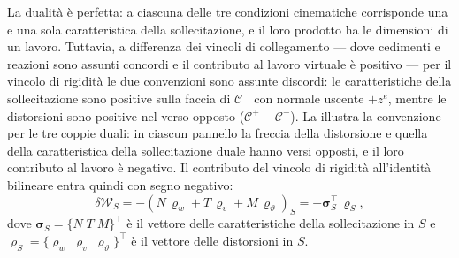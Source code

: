 La dualità è perfetta: a ciascuna delle tre
condizioni cinematiche corrisponde una e una sola
caratteristica della sollecitazione, e il loro
prodotto ha le dimensioni di un lavoro. Tuttavia,
a differenza dei vincoli di collegamento --- dove
cedimenti e reazioni sono assunti concordi e il
contributo al lavoro virtuale è positivo ---
per il vincolo di rigidità le due convenzioni
sono assunte discordi: le caratteristiche della
sollecitazione sono positive sulla faccia di
$\mathcal{C}^-$ con normale uscente $+z^e$, mentre
le distorsioni sono positive nel verso opposto
($\mathcal{C}^+ - \mathcal{C}^-$). 
La  illustra la 
convenzione per le tre coppie duali: in ciascun 
pannello la freccia della distorsione e quella 
della caratteristica della sollecitazione duale 
hanno versi opposti, e il loro contributo al 
lavoro è negativo. 
Il contributo del vincolo di rigidità all'identità 
bilineare entra quindi con segno negativo:
\begin{equation}\label{eq:lavoro_continuita}
	\delta\mathcal{W}_S =	-\left(N\,\varrho_w + T\,\varrho_v +	M\,\varrho_\vartheta\right)_S =	-\bm{\sigma}_S^{\top}\,\bm{\varrho}_S,
\end{equation}
dove $\bm{\sigma}_S = \{N\; T\; M\}^{\!\top}$ è il
vettore delle caratteristiche della sollecitazione in $S$
e $\bm{\varrho}_S = \{\varrho_w\; \varrho_v\;
\varrho_\vartheta\}^{\!\top}$ è il vettore
delle distorsioni in $S$.

